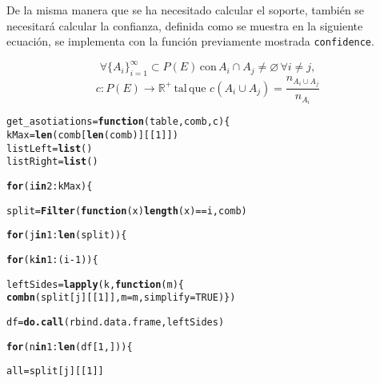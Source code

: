 \documentclass[12pt]{report}\usepackage[]{graphicx}\usepackage[dvipsnames]{xcolor}
\makeatletter
\newcommand{\hlnum}[1]{\textcolor[rgb]{0.686,0.059,0.569}{#1}}%
\newcommand{\hlopt}[1]{\textcolor[rgb]{0,0,0}{#1}}%
\newcommand{\hlstd}[1]{\textcolor[rgb]{0.345,0.345,0.345}{#1}}%
\newcommand{\hlkwa}[1]{\textcolor[rgb]{0.161,0.373,0.58}{\textbf{#1}}}%
\newcommand{\hlkwb}[1]{\textcolor[rgb]{0.69,0.353,0.396}{#1}}%
\newcommand{\hlkwc}[1]{\textcolor[rgb]{0.333,0.667,0.333}{#1}}%
\newcommand{\hlkwd}[1]{\textcolor[rgb]{0.737,0.353,0.396}{\textbf{#1}}}%
\newenvironment{kframe}{%
 \def\at@end@of@kframe{}%
 \ifinner\ifhmode%
  \def\at@end@of@kframe{\end{minipage}}%
  \begin{minipage}{\columnwidth}%
 \fi\fi%
 \def\FrameCommand##1{\hskip\@totalleftmargin \hskip-\fboxsep
 \colorbox{shadecolor}{##1}\hskip-\fboxsep
     \hskip-\linewidth \hskip-\@totalleftmargin \hskip\columnwidth}%
 \MakeFramed {\advance\hsize-\width
   \@totalleftmargin\z@ \linewidth\hsize
   \@setminipage}}%
 {\par\unskip\endMakeFramed%
 \at@end@of@kframe}
\newenvironment{knitrout}{}{} %
\makeatother
\begin{document}
			De la misma manera que se ha necesitado calcular el soporte, también se necesitará calcular la confianza, definida como se muestra en la siguiente ecuación, se implementa con la función previamente mostrada \texttt{confidence}. 
			
			$$
			\forall\{A_i\}_{i=1}^\infty \subset P(E) \, \text{con} \, A_i \cap A_j \neq \varnothing \, \forall i \neq j,
			$$
			$$
			c: P(E) \longrightarrow \mathbb{R}^+ \, \text{tal} \, \text{que} \,\, c(A_i \cup A_j) = \frac{n_{A_i \cup A_j}}{n_{A_i}}
			$$
			
\begin{knitrout}
\color{fgcolor}\begin{kframe}
\begin{alltt}
\hlstd{get_asotiations} \hlkwb{=} \hlkwa{function}\hlstd{(}\hlkwc{table}\hlstd{,} \hlkwc{comb}\hlstd{,} \hlkwc{c}\hlstd{) \{}
        \hlstd{kMax} \hlkwb{=} \hlkwd{len}\hlstd{(comb[}\hlkwd{len}\hlstd{(comb)][[}\hlnum{1}\hlstd{]])}
        \hlstd{listLeft} \hlkwb{=} \hlkwd{list}\hlstd{()}
        \hlstd{listRight} \hlkwb{=} \hlkwd{list}\hlstd{()}

        \hlkwa{for} \hlstd{(i} \hlkwa{in} \hlnum{2}\hlopt{:}\hlstd{kMax) \{}

                \hlstd{split} \hlkwb{=} \hlkwd{Filter}\hlstd{(}\hlkwa{function}\hlstd{(}\hlkwc{x}\hlstd{)} \hlkwd{length}\hlstd{(x)}\hlopt{==}\hlstd{i, comb)}

                \hlkwa{for} \hlstd{(j} \hlkwa{in} \hlnum{1}\hlopt{:}\hlkwd{len}\hlstd{(split)) \{}

                        \hlkwa{for} \hlstd{(k} \hlkwa{in} \hlnum{1}\hlopt{:}\hlstd{(i}\hlopt{-}\hlnum{1}\hlstd{)) \{}

                                \hlstd{leftSides} \hlkwb{=} \hlkwd{lapply}\hlstd{(k,} \hlkwa{function}\hlstd{(}\hlkwc{m}\hlstd{) \{}
                                        \hlkwd{combn}\hlstd{(split[j][[}\hlnum{1}\hlstd{]],} \hlkwc{m}\hlstd{=m,} \hlkwc{simplify}\hlstd{=}\hlnum{TRUE}\hlstd{)\})}

                                \hlstd{df} \hlkwb{=} \hlkwd{do.call}\hlstd{(rbind.data.frame, leftSides)}

                                \hlkwa{for} \hlstd{(n} \hlkwa{in} \hlnum{1}\hlopt{:}\hlkwd{len}\hlstd{(df[}\hlnum{1}\hlstd{,])) \{}

                                        \hlstd{all} \hlkwb{=} \hlstd{split[j][[}\hlnum{1}\hlstd{]]}


\end{alltt}
\end{kframe}
\end{knitrout}
\end{document}
